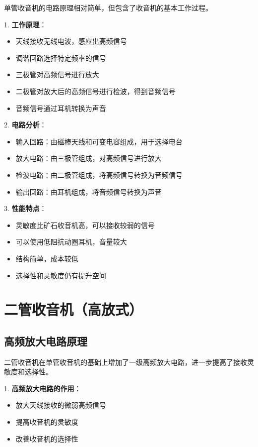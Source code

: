 \documentclass[12pt,UTF8]{ctexbook}
\begin{document}
单管收音机的电路原理相对简单，但包含了收音机的基本工作过程。

1. \textbf{工作原理}：
   \begin{itemize}[leftmargin=3.5em]
   \item 天线接收无线电波，感应出高频信号
   \item 调谐回路选择特定频率的信号
   \item 三极管对高频信号进行放大
   \item 二极管对放大后的高频信号进行检波，得到音频信号
   \item 音频信号通过耳机转换为声音
   \end{itemize}

2. \textbf{电路分析}：
   \begin{itemize}[leftmargin=3.5em]
   \item 输入回路：由磁棒天线和可变电容组成，用于选择电台
   \item 放大电路：由三极管组成，对高频信号进行放大
   \item 检波电路：由二极管组成，将高频信号转换为音频信号
   \item 输出回路：由耳机组成，将音频信号转换为声音
   \end{itemize}

3. \textbf{性能特点}：
   \begin{itemize}[leftmargin=3.5em]
   \item 灵敏度比矿石收音机高，可以接收较弱的信号
   \item 可以使用低阻抗动圈耳机，音量较大
   \item 结构简单，成本较低
   \item 选择性和灵敏度仍有提升空间
   \end{itemize}

\chapter{二管收音机（高放式）}
\section{高频放大电路原理}

二管收音机在单管收音机的基础上增加了一级高频放大电路，进一步提高了接收灵敏度和选择性。

1. \textbf{高频放大电路的作用}：
   \begin{itemize}[leftmargin=3.5em]
   \item 放大天线接收的微弱高频信号
   \item 提高收音机的灵敏度
   \item 改善收音机的选择性
   \end{itemize}
\end{document}
